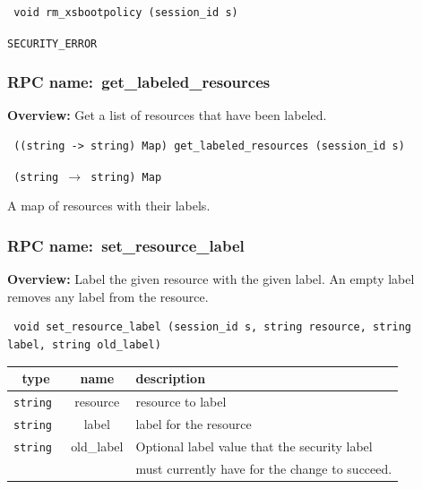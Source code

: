 \begin{verbatim} void rm_xsbootpolicy (session_id s)\end{verbatim}

\vspace{0.3cm}

 {\tt SECURITY\_ERROR}

\vspace{0.3cm}
\vspace{0.3cm}
\vspace{0.3cm}
\subsubsection{RPC name:~get\_labeled\_resources}

{\bf Overview:}
Get a list of resources that have been labeled.

\begin{verbatim} ((string -> string) Map) get_labeled_resources (session_id s)\end{verbatim}


\vspace{0.3cm}

{\tt
(string $\rightarrow$ string) Map
}


A map of resources with their labels.
\vspace{0.3cm}
\vspace{0.3cm}
\vspace{0.3cm}
\subsubsection{RPC name:~set\_resource\_label}

{\bf Overview:}
Label the given resource with the given label. An empty label removes any label
from the resource.

\begin{verbatim} void set_resource_label (session_id s, string resource, string
label, string old_label)\end{verbatim}




\vspace{0.3cm}
\begin{tabular}{|c|c|p{7cm}|}
 \hline
{\bf type} & {\bf name} & {\bf description} \\ \hline
{\tt string } & resource & resource to label \\ \hline
{\tt string } & label & label for the resource \\ \hline
{\tt string } & old\_label & Optional label value that the security label \\
& & must currently have for the change to succeed. \\ \hline

\end{tabular}

